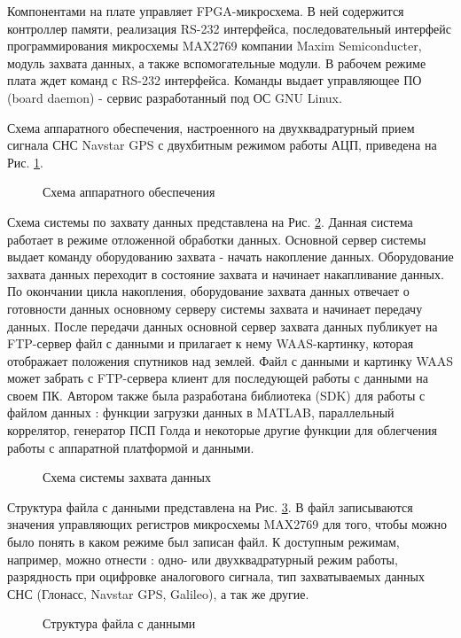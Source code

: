 Компонентами на плате управляет FPGA-микросхема. В ней содержится контроллер памяти, реализация RS-232 интерфейса, последовательный интерфейс программирования микросхемы
MAX2769 компании Maxim Semiconducter, модуль захвата данных, а также вспомогательные модули. В рабочем режиме плата ждет команд с RS-232 интерфейса.
Команды выдает управляющее ПО (board daemon) - сервис разработанный под ОС GNU Linux.

Схема аппаратного обеспечения, настроенного на двухквадратурный прием сигнала СНС Navstar GPS с двухбитным режимом работы АЦП, приведена на Рис. \ref{pic:board_scheme}.
\begin{figure}[h]
	\center{}
	\caption{Схема аппаратного обеспечения}
	\label{pic:board_scheme}
\end{figure}

Схема системы по захвату данных представлена на Рис. \ref{pic:gps_acq_system_scheme}. Данная система работает в режиме отложенной обработки данных. Основной сервер системы
выдает команду оборудованию захвата - начать накопление данных. Оборудование захвата данных переходит в состояние захвата и начинает накапливание данных. По окончании цикла
накопления, оборудование захвата данных отвечает о готовности данных основному серверу системы захвата и начинает передачу данных. После передачи данных основной сервер
захвата данных публикует на FTP-сервер файл с данными и прилагает к нему WAAS-картинку, которая отображает положения спутников над землей. Файл с данными
и картинку WAAS может забрать с FTP-сервера клиент для последующей работы с данными на своем ПК. Автором также была разработана библиотека (SDK) для работы с файлом данных
\cite{github-gpsproject}: функции загрузки данных в MATLAB, параллельный коррелятор, генератор ПСП Голда и некоторые другие функции для облегчения работы с аппаратной платформой
и данными.

\begin{figure}[h]
	\center{}
	\caption{Схема системы захвата данных}
	\label{pic:gps_acq_system_scheme}
\end{figure}

Структура файла с данными представлена на Рис. \ref{pic:dump_file}. В файл записываются значения управляющих регистров микросхемы MAX2769 для того, чтобы можно было
понять в каком режиме был записан файл. К доступным режимам, например, можно отнести \cite{max2769_manual}: одно- или двухквадратурный режим работы, разрядность при оцифровке
аналогового сигнала, тип захватываемых данных СНС (Глонасс, Navstar GPS, Galileo), а так же другие.
\begin{figure}[h]
	\center{}
	\caption{Структура файла с данными}
	\label{pic:dump_file}
\end{figure}

